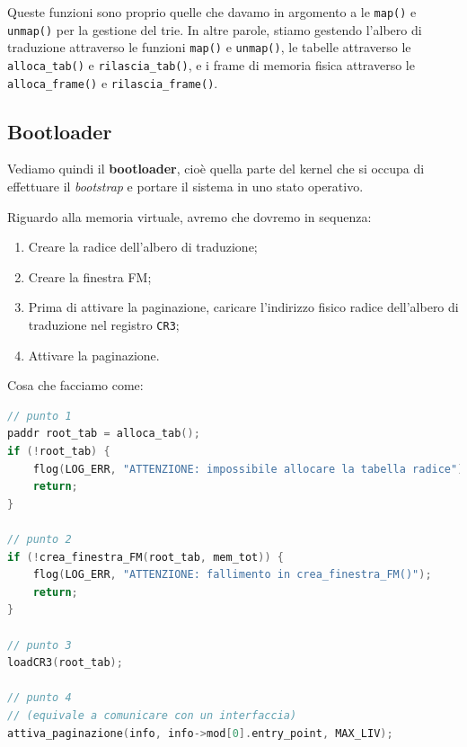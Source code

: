 \documentclass[a4paper,11pt]{article}
\begin{document}
Queste funzioni sono proprio quelle che davamo in argomento a le \lstinline|map()| e \lstinline|unmap()| per la gestione del trie.
In altre parole, stiamo gestendo l'albero di traduzione attraverso le funzioni \lstinline|map()| e \lstinline|unmap()|, le tabelle attraverso le \lstinline|alloca_tab()| e \lstinline|rilascia_tab()|, e i frame di memoria fisica attraverso le \lstinline|alloca_frame()| e \lstinline|rilascia_frame()|.

\subsection{Bootloader}
Vediamo quindi il \textbf{bootloader}, cioè quella parte del kernel che si occupa di effettuare il \textit{bootstrap} e portare il sistema in uno stato operativo.

Riguardo alla memoria virtuale, avremo che dovremo in sequenza:
\begin{enumerate}
	\item Creare la radice dell'albero di traduzione;
	\item Creare la finestra FM;
	\item Prima di attivare la paginazione, caricare l'indirizzo fisico radice dell'albero di traduzione nel registro \lstinline|CR3|;
	\item Attivare la paginazione.
\end{enumerate}

Cosa che facciamo come:
\begin{lstlisting}[language=C++, style=codestyle]	
// punto 1
paddr root_tab = alloca_tab();
if (!root_tab) {
	flog(LOG_ERR, "ATTENZIONE: impossibile allocare la tabella radice");
	return;
}

// punto 2
if (!crea_finestra_FM(root_tab, mem_tot)) {
	flog(LOG_ERR, "ATTENZIONE: fallimento in crea_finestra_FM()");
	return;
}

// punto 3
loadCR3(root_tab);

// punto 4
// (equivale a comunicare con un interfaccia)
attiva_paginazione(info, info->mod[0].entry_point, MAX_LIV);  
\end{lstlisting}
\end{document}
